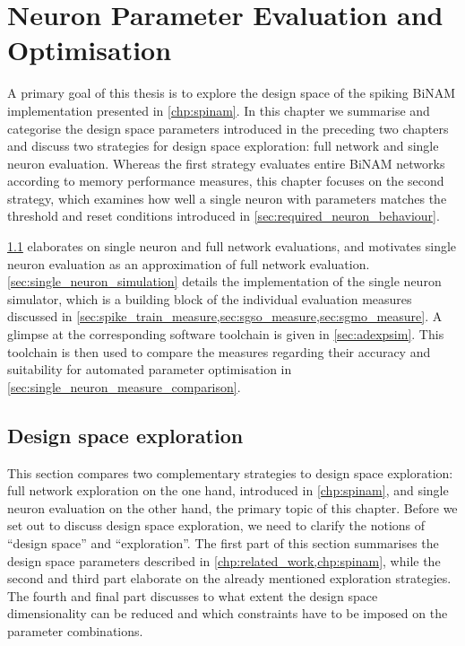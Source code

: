 \chapter{Neuron Parameter Evaluation and Optimisation}
\label{chp:neuron_evaluation}


A primary goal of this thesis is to explore the design space of the spiking \acrshort{BiNAM} implementation presented in \cref{chp:spinam}. In this chapter we summarise and categorise the design space parameters introduced in the preceding two chapters and discuss two strategies for design space exploration: full network and single neuron evaluation. Whereas the first strategy evaluates entire \acrshort{BiNAM} networks according to memory performance measures, this chapter focuses on the second strategy, which examines how well a single neuron with parameters \nParams matches the threshold and reset conditions introduced in \cref{sec:required_neuron_behaviour}.

\cref{sec:design_space} elaborates on single neuron and full network evaluations, and motivates single neuron evaluation as an approximation of full network evaluation. \cref{sec:single_neuron_simulation} details the implementation of the single neuron simulator, which is a building block of the individual evaluation measures discussed in \cref{sec:spike_train_measure,sec:sgso_measure,sec:sgmo_measure}. A glimpse at the corresponding software toolchain is given in \cref{sec:adexpsim}. This toolchain is then used to compare the measures regarding their accuracy and suitability for automated parameter optimisation in \cref{sec:single_neuron_measure_comparison}.

\section{Design space exploration}
\label{sec:design_space}

This section compares two complementary strategies to design space exploration: full network exploration on the one hand, introduced in \cref{chp:spinam}, and single neuron evaluation on the other hand, the primary topic of this chapter. Before we set out to discuss design space exploration, we need to clarify the notions of \enquote{design space} and \enquote{exploration}. The first part of this section summarises the design space parameters described in \cref{chp:related_work,chp:spinam}, while the second and third part elaborate on the already mentioned exploration strategies. The fourth and final part discusses to what extent the design space dimensionality can be reduced and which constraints have to be imposed on the parameter combinations.

